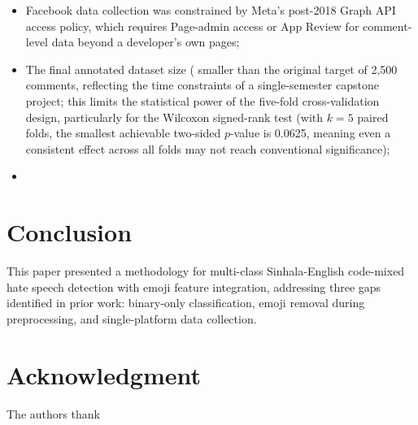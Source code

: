 \documentclass[journal]{IEEEtran}
\begin{document}
\begin{itemize}
\item Facebook data collection was constrained by Meta's post-2018
Graph API access policy, which requires Page-admin access or App Review
for comment-level data beyond a developer's own pages; %
\item The final annotated dataset size ( %
smaller than the original target of 2,500 comments, reflecting the time
constraints of a single-semester capstone project; this limits the
statistical power of the five-fold cross-validation design, particularly
for the Wilcoxon signed-rank test (with $k=5$ paired folds, the smallest
achievable two-sided $p$-value is 0.0625, meaning even a consistent
effect across all folds may not reach conventional significance);
\item %
\end{itemize}

\section{Conclusion}

This paper presented a methodology for multi-class Sinhala-English
code-mixed hate speech detection with emoji feature integration,
addressing three gaps identified in prior work: binary-only
classification, emoji removal during preprocessing, and single-platform
data collection. %

\section*{Acknowledgment}
The authors thank %
\end{document}
